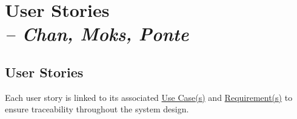 \makeatletter
\renewcommand{\UserStoryLabel}[2]{\label{userstory:#2}} %
\renewcommand{\UserStoryReference}[2]{\hyperref[userstory:#2]{\textbf{US-#2}}} %
\makeatother
\hypersetup{colorlinks=true, linkcolor=blue, urlcolor=blue, citecolor=blue}

\chapter{User Stories \\
\small{\textit{-- Chan, Moks, Ponte}}
\label{Chapter::UserStories}}

\section{User Stories}
\label{sec:userstories}
\noindent
Each user story is linked to its associated \hyperref[Chapter::UseCases]{Use Case(s)} and \hyperref[Table::RequirementsUser]{Requirement(s)} to ensure traceability throughout the system design. \\[4pt]

